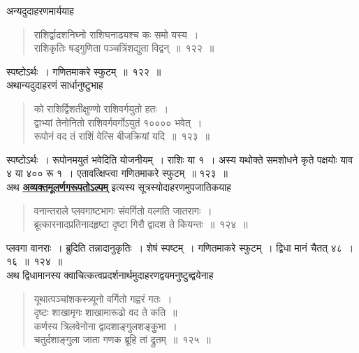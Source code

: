 \documentclass[11pt, openany]{book}
\begin{document}
\vspace{-2mm}
अन्यदुदाहरणमार्ययाह\textendash
\begin{quote}
    \eg 
    राशिर्द्वादशनिघ्नो राशिघनाढ्यश्च कः समो यस्य~। \\
 राशिकृतिः षड्गुणिता पञ्चत्रिंशद्युता विद्वन्~॥~१२२~॥
\end{quote}
 \newpage
 स्पष्टोऽर्थः~। गणितमाकरे स्फुटम्~॥~१२२~॥\\ 

\vspace{-2mm}
 अथान्यदुदाहरणं सार्धानुष्टुभाह\textendash
\begin{quote}
    \eg 
    को राशिर्द्विशतीक्षुण्णो राशिवर्गयुतो हतः~। \\
 द्वाभ्यां तेनोनितो राशिवर्गवर्गोऽयुतं १०००० भवेत्~। \\
 रूपोनं वद तं राशिं वेत्सि बीजक्रियां यदि~॥~१२३~॥~
\end{quote}

 स्पष्टोऽर्थः~। रूपोनमयुतं भवेदिति योजनीयम्~। राशिः या १~।
अस्य 
यथोक्ते समशोधने कृते पक्षयोः याव ४ या ४०० रू १~।
एतावत्क्षिप्त्वा गणितमाकरे 
स्फुटम्~॥ १२३~॥ \\

\vspace{-2mm}
 अथ \hyperref[115]{\textbf{अव्यक्तमूलर्णगरूपतोऽल्पम्}} इत्यस्य सूत्रस्योदाहरणमुपजातिकयाह\textendash
 
 \label{124}
\begin{quote}
    \eg 
    वनान्तराले प्लवगाष्टभागः संवर्गितो वल्गति जातरागः~। \\
 ब्रूत्कारनादप्रतिनादहृष्टा दृष्टा गिरौ द्वादश ते कियन्तः~॥~१२४~॥~
\end{quote}

 प्लवगा वानराः~। ब्रुदिति तन्नादानुकृतिः~। शेषं स्पष्टम्~। गणितमाकरे 
स्फुटम्~। द्विधा मानं चैतत् ४८~। १६~॥~१२४~॥ \\

\vspace{-2mm}
 अथ द्विधामानस्य क्वाचित्कत्वप्रदर्शनार्थमुदाहरणद्वयमनुष्टुब्द्वयेनाह\textendash
 
 \label{125}
\begin{quote}
    \eg
    यूथात्पञ्चांशकस्त्र्यूनो वर्गितो गह्वरं गतः~। \\
 दृष्टः शाखामृगः शाखामारूढो वद ते कति~॥~\\
 कर्णस्य त्रिलवेनोना द्वादशाङ्गुलशङ्कुुभा~। \\
 चतुर्दशाङ्गुला जाता गणक ब्रूहि तां द्रुतम्~॥~१२५~॥~
\end{quote}
 
\end{document}
